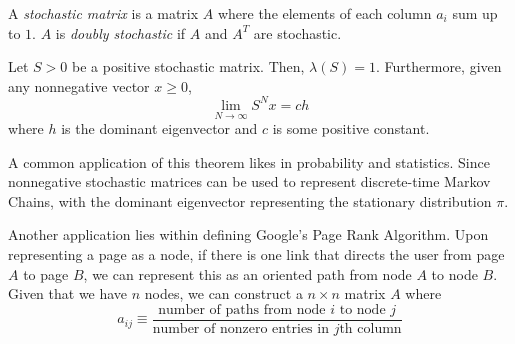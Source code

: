 \documentclass{article}
\begin{document}
    \begin{definition}
    A \textit{stochastic matrix} is a matrix $A$ where the elements of each column $a_i$ sum up to $1$. $A$ is \textit{doubly stochastic} if $A$ and $A^T$ are stochastic. 
    \end{definition}

    \begin{theorem}
    Let $S > 0$ be a positive stochastic matrix. Then, $\lambda(S) = 1$. Furthermore, given any nonnegative vector $x \geq 0$, 
    \[\lim_{N \rightarrow \infty} S^N x = c h\]
    where $h$ is the dominant eigenvector and $c$ is some positive constant. 
    \end{theorem}

    A common application of this theorem likes in probability and statistics. Since nonnegative stochastic matrices can be used to represent discrete-time Markov Chains, with the dominant eigenvector representing the stationary distribution $\pi$. 

    Another application lies within defining Google's Page Rank Algorithm. Upon representing a page as a node, if there is one link that directs the user from page $A$ to page $B$, we can represent this as an oriented path from node $A$ to node $B$. Given that we have $n$ nodes, we can construct a $n \times n$ matrix $A$ where 
    \[a_{i j} \equiv  \frac{\text{number of paths from node $i$ to node $j$}}{\text{number of nonzero entries in $j$th column}}\]
\end{document}
